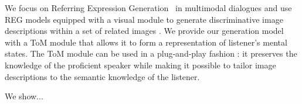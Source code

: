 We focus on Referring Expression Generation~\citep[REG;][]{reiter1997building,krahmer-van-deemter-2012-computational} in multimodal dialogues and use REG models equipped with a visual module to generate discriminative image descriptions within a set of related images \cite{andreas-klein-2016-reasoning,vedantam2017context,zarriess-schlangen-2019-know}. We provide our generation model with a ToM module that allows it to form a representation of listener's mental states. The ToM module can be used in a plug-and-play fashion \cite{dathathri2020plug}: it preserves the knowledge of the proficient speaker while making it possible to tailor image descriptions to the semantic knowledge of the listener.

We show...

\begin{comment}
\begin{itemize}
\item To communicate effectively, speaker and listener co-ordinate their use and interpretation of language, within the context of a particular exchange \cite{GarrodAnderson1987}.  In a conversation, speakers develop a language that is specific to the state of affairs and relies on dynamically / interactively established "conceptual pacts" \cite{GarrodAnderson1987,BrennanClark1996}. For example, a speaker's subsequent references \cite{mcdonald-1978-subsequent-reference} to the same entities in a conversation become attuned to the descriptions and interpretation of their conversation partners. References tend to become partner-specific \cite{BrennanClark1996,metzing2003conceptual,brennan2009partner}---because speakers reuse expressions that were successfully interpreted by their immediate partner---and more efficient---as common ground builds up between the interlocutors \cite{stalnaker2002common}, parts of referring expressions can be left implicit \cite{Grice75,ClarkWilkes-Gibbs1986,clark1991grounding,Clark1996}. 

\item Models of reference that consider the conversational history between interlocutors offer a better account of experimental human data \cite{BrennanClark1996,hawkins2020characterizing} and they are more effective for the generation of human-like referring expressions in conversation \cite{takmaz-etal-2020-refer,hawkins2020continual}. This line of work is based on the idea that the general conventions of meaning serve as starting points for interpretation, and may be overwritten by more local and ad hoc conventions set up during the course of a dialogue \cite{GarrodAnderson1987,ClarkWilkes-Gibbs1986}


\end{comment}
